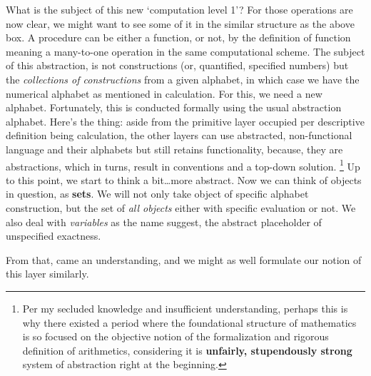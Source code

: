 What is the subject of this new `computation level 1'? For those operations are now clear, we might want to see some of it in the similar structure as the above box. A procedure can be either a function, or not, by the definition of function meaning a many-to-one operation in the same computational scheme. The subject of this abstraction, is not constructions (or, quantified, specified numbers) but the \textit{collections of constructions} from a given alphabet, in which case we have the numerical alphabet as mentioned in calculation. For this, we need a new alphabet. Fortunately, this is conducted formally using the usual abstraction alphabet. Here's the thing: aside from the primitive layer occupied per descriptive definition being calculation, the other layers can use abstracted, non-functional language and their alphabets but still retains functionality, because, they are abstractions, which in turns, result in conventions and a top-down solution. \footnote{Per my secluded knowledge and insufficient understanding, perhaps this is why there existed a period where the foundational structure of mathematics is so focused on the objective notion of the formalization and rigorous definition of arithmetics, considering it is \textbf{unfairly, stupendously strong} system of abstraction right at the beginning.} Up to this point, we start to think a bit\dots more abstract. Now we can think of objects in question, as \textbf{sets}. We will not only take object of specific alphabet construction, but the set of \textit{all objects} either with specific evaluation or not. We also deal with \textit{variables} as the name suggest, the abstract placeholder of unspecified exactness. 

From that, came an understanding, and we might as well formulate our notion of this layer similarly. 


